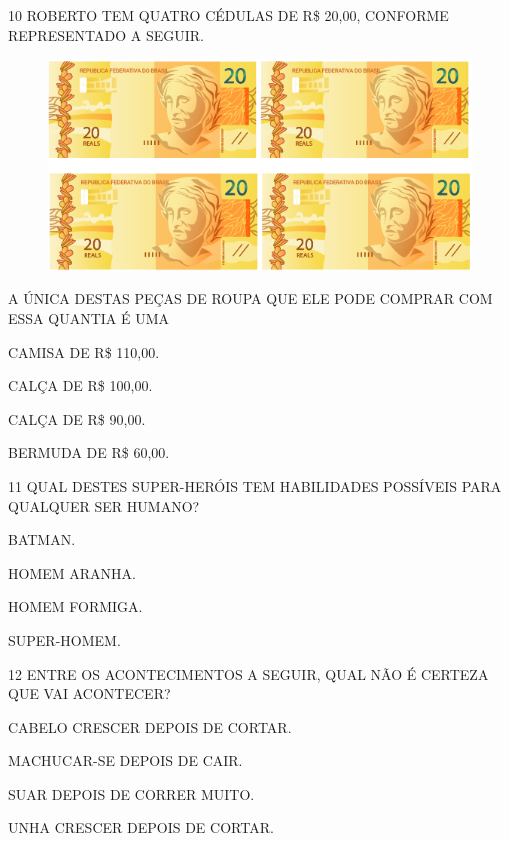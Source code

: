 \num{10} ROBERTO TEM QUATRO CÉDULAS DE R\$ 20,00, CONFORME REPRESENTADO A SEGUIR.

\begin{figure}[htpb!]
\centering
\includegraphics[width=\textwidth]{./media/SAEB_1ANO_MAT_FIGURA133b.png}
\end{figure}

A ÚNICA DESTAS PEÇAS DE ROUPA QUE ELE PODE COMPRAR COM ESSA QUANTIA É UMA

\begin{escolha}[itemsep=0pt]
\item CAMISA DE R\$ 110,00.

\item CALÇA DE R\$ 100,00.

\item CALÇA DE R\$ 90,00.

\item BERMUDA DE R\$ 60,00.
\end{escolha}

\num{11} QUAL DESTES SUPER-HERÓIS TEM HABILIDADES POSSÍVEIS PARA QUALQUER SER HUMANO?

\begin{escolha}[itemsep=0pt]
\item BATMAN.

\item HOMEM ARANHA.

\item HOMEM FORMIGA.

\item SUPER-HOMEM.
\end{escolha}

\pagebreak
\num{12} ENTRE OS ACONTECIMENTOS A SEGUIR, QUAL NÃO É CERTEZA QUE VAI
ACONTECER?

\begin{escolha}[itemsep=0pt]
\item CABELO CRESCER DEPOIS DE CORTAR.

\item MACHUCAR-SE DEPOIS DE CAIR.

\item SUAR DEPOIS DE CORRER MUITO.

\item UNHA CRESCER DEPOIS DE CORTAR.
\end{escolha}

